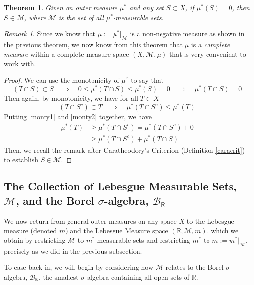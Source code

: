\documentclass[12pt]{article}
\theoremstyle{plain}
\newtheorem{thm}{Theorem}[subsection]
\theoremstyle{definition}
\theoremstyle{remark}
\newtheorem*{rmk}{Remark}
\begin{document}
\begin{thm}
Given an outer measure $\mu^*$ and any set $S\subset X$, if $\mu^*(S)=0$, then $S\in\mathscr{M}$, where $\mathscr{M}$ is the set of all $\mu^*$-measurable sets. 
\end{thm}
\begin{rmk}
Since we know that $\mu:=\mu^*|_{\mathscr{M}}$ is a non-negative measure as shown in the previous theorem, we now know from this theorem that $\mu$ is a \emph{complete measure} within a complete measure space $(X, \mathscr{M}, \mu)$ that is very convenient to work with.
\end{rmk}
\begin{proof}
We can use the monotonicity of $\mu^*$ to say that
\begin{equation}
    \label{monty1}
    (T\cap S) \subset S 
    \quad \Rightarrow\quad
    0\leq\mu^*(T\cap S) \leq \mu^*(S) = 0
    \quad \Rightarrow\quad
    \mu^*(T\cap S) = 0 
\end{equation}
Then again, by monotonicity, we have for all $T\subset X$
\begin{equation}
    \label{monty2}
    (T\cap S^c) \subset T
    \quad \Rightarrow\quad
    \mu^*(T\cap S^c) \leq \mu^*(T)
\end{equation}
Putting \ref{monty1} and \ref{monty2} together, we have
\begin{align*}
    \mu^*(T) &\geq 
    \mu^*(T\cap S^c) =  
    \mu^*(T\cap S^c) + 0  \\
    &\geq \mu^*(T\cap S^c) + \mu^*(T\cap S)
\end{align*}
Then, we recall the remark after Caratheodory's Criterion (Definition \ref{caracrit}) to establish $S\in\mathscr{M}$.

\end{proof}


\newpage
\subsection{The Collection of Lebesgue Measurable Sets, $\mathscr{M}$, and the Borel $\sigma$-algebra, $\mathscr{B}_\mathbb{R}$}

We now return from general outer measures on any space $X$ to the Lebesgue measure (denoted $m$) and the Lebesgue Measure space $(\mathbb{R},\mathscr{M},m)$, which we obtain by restricting $\mathscr{M}$ to $m^*$-measurable sets and restricting $m^*$ to $m:=m^*|_\mathscr{M}$, precisely as we did in the previous subsection.

To ease back in, we will begin by considering how $\mathscr{M}$ relates to the Borel $\sigma$-algebra, $\mathscr{B}_\mathbb{R}$, the smallest $\sigma$-algebra containing all open sets of $\mathbb{R}$.
\end{document}
